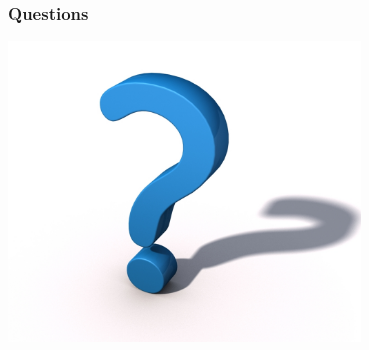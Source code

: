 \begin{frame}
\frametitle{Questions}
	\begin{center} 
  		\includegraphics[width=0.7\textwidth]{question-mark.jpg} 
	\end{center} 
\end{frame}
